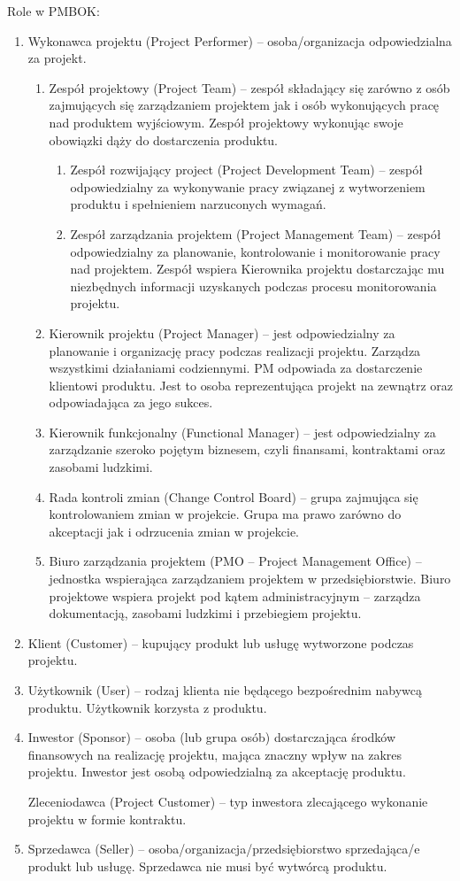 Role w PMBOK:
\begin{enumerate}
\item	Wykonawca projektu (Project Performer) – osoba/organizacja odpowiedzialna za projekt.
	\begin{enumerate}
	\item	Zespół projektowy (Project Team) – zespół składający się zarówno z osób zajmujących się zarządzaniem projektem jak i  osób wykonujących pracę nad produktem wyjściowym.  Zespół projektowy wykonując swoje obowiązki dąży do dostarczenia produktu.
		\begin{enumerate}
		\item	Zespół rozwijający project (Project Development Team) – zespół odpowiedzialny za wykonywanie pracy związanej z wytworzeniem produktu i spełnieniem narzuconych wymagań.
		\item	Zespół zarządzania projektem (Project Management Team) – zespół odpowiedzialny za planowanie, kontrolowanie i monitorowanie pracy nad projektem. Zespół wspiera Kierownika projektu dostarczając mu niezbędnych informacji uzyskanych podczas procesu monitorowania projektu.
		\end{enumerate}
	\item	Kierownik projektu (Project Manager) – jest odpowiedzialny za planowanie i organizację pracy podczas realizacji projektu. Zarządza wszystkimi działaniami codziennymi. PM odpowiada za dostarczenie klientowi produktu. Jest to osoba reprezentująca projekt na zewnątrz oraz odpowiadająca za jego sukces.
	\item	Kierownik funkcjonalny (Functional Manager) – jest odpowiedzialny za zarządzanie szeroko pojętym biznesem, czyli finansami, kontraktami oraz zasobami ludzkimi.
	\item	Rada kontroli zmian (Change Control Board) – grupa zajmująca się kontrolowaniem zmian w projekcie. Grupa ma prawo zarówno do akceptacji jak i odrzucenia zmian w projekcie. 
	\item	Biuro zarządzania projektem (PMO – Project Management Office) – jednostka wspierająca zarządzaniem projektem w przedsiębiorstwie. Biuro projektowe wspiera projekt pod kątem administracyjnym – zarządza dokumentacją, zasobami ludzkimi i przebiegiem projektu.
	\end{enumerate}
\item	Klient (Customer) – kupujący produkt lub usługę wytworzone podczas projektu.  
\item	Użytkownik (User) – rodzaj klienta nie będącego bezpośrednim nabywcą produktu. Użytkownik korzysta  z produktu.
\item	Inwestor (Sponsor) – osoba (lub grupa osób) dostarczająca środków finansowych na realizację projektu, mająca znaczny wpływ na zakres projektu. Inwestor jest osobą odpowiedzialną za akceptację produktu.

Zleceniodawca (Project Customer) – typ inwestora zlecającego wykonanie projektu w formie kontraktu. 
\item	Sprzedawca (Seller) – osoba/organizacja/przedsiębiorstwo sprzedająca/e produkt lub usługę. Sprzedawca nie musi być wytwórcą produktu.
\end{enumerate}

